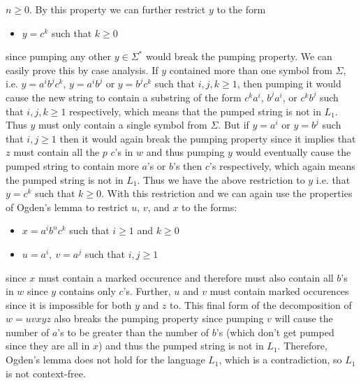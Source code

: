 \documentclass[12pt]{article}
\begin{document}
$n \ge 0$. By this property we can further restrict $y$ to the form
\begin{itemize}
\item $y=c^k$ such that $k\ge 0$
\end{itemize}
since pumping any other $y \in \Sigma^*$ would break the pumping property. We
can easily prove this by case analysis. If $y$ contained more than one symbol
from $\Sigma$, i.e. $y=a^ib^jc^k$, $y=a^ib^j$ or $y=b^jc^k$ such that $i,j,k\ge
1$, then pumping it would cause the new string to contain a substring of the
form $c^ka^i$, $b^ja^i$, or $c^kb^j$ such that $i,j,k\ge 1$ respectively,
which means that the pumped string is not in $L_1$. Thus $y$ must only contain
a single symbol from $\Sigma$. But if $y=a^i$ or $y=b^j$ such that $i,j\ge 1$
then it would again break the pumping property since it implies that $z$ must
contain all the $p$ $c$'s in $w$ and thus pumping $y$ would eventually cause
the pumped string to contain more $a$'s or $b$'s then $c$'s respectively,
which again means the pumped string is not in $L_1$. Thus we have the above
restriction to $y$ i.e. that $y=c^k$ such that $k\ge 0$. With this restriction
and we can again use the properties of Ogden's lemma to restrict $u$, $v$, and
$x$ to the forms:
\begin{itemize}
\item $x=a^ib^nc^k$ such that $i\ge 1$ and $k\ge 0$
\item $u=a^i,\ v=a^j$ such that $i,j\ge 1$
\end{itemize}
since $x$ must contain a marked occurence and therefore must also contain all
$b$'s in $w$ since $y$ contains only $c$'s. Further, $u$ and $v$ must contain
marked occurences since it is impossible for both $y$ and $z$ to. This final
form of the decomposition of $w=uvxyz$ also breaks the pumping property since
pumping $v$ will cause the number of $a$'s to be greater than the number of
$b$'s (which don't get pumped since they are all in $x$) and thus the pumped
string is not in $L_1$. Therefore, Ogden's lemma does not hold for the language
$L_1$, which is a contradiction, so $L_1$ is not context-free.
\end{document}
